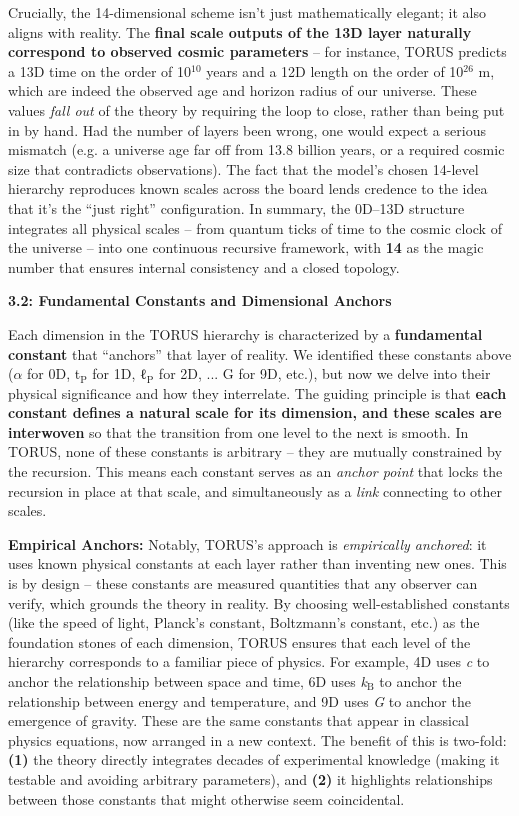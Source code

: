 \documentclass[]{article}
\newcommand{\subscript}[1]{\ensuremath{_{\mathrm{#1}}}}
\newcommand{\superscript}[1]{\ensuremath{^{\mathrm{#1}}}}
\begin{document}
Crucially, the 14-dimensional scheme isn't just mathematically elegant;
it also aligns with reality. The \textbf{final scale outputs of the 13D
layer naturally correspond to observed cosmic parameters} -- for
instance, TORUS predicts a 13D time on the order of 10\superscript{10} years and a
12D length on the order of 10\superscript{26} m, which are indeed the observed age
and horizon radius of our universe​. These values \emph{fall out} of the
theory by requiring the loop to close, rather than being put in by hand.
Had the number of layers been wrong, one would expect a serious mismatch
(e.g. a universe age far off from 13.8 billion years, or a required
cosmic size that contradicts observations). The fact that the model's
chosen 14-level hierarchy reproduces known scales across the board lends
credence to the idea that it's the ``just right'' configuration. In
summary, the 0D--13D structure integrates all physical scales -- from
quantum ticks of time to the cosmic clock of the universe -- into one
continuous recursive framework, with \textbf{14} as the magic number
that ensures internal consistency and a closed topology​.

\textbf{3.2: Fundamental Constants and Dimensional Anchors}

Each dimension in the TORUS hierarchy is characterized by a
\textbf{fundamental constant} that ``anchors'' that layer of reality. We
identified these constants above ($\alpha$ for 0D,
t\subscript{P} for 1D,
ℓ\subscript{P} for 2D, ...
G for 9D, etc.), but now we delve into their physical significance and
how they interrelate. The guiding principle is that \textbf{each
constant defines a natural scale for its dimension, and these scales are
interwoven} so that the transition from one level to the next is smooth.
In TORUS, none of these constants is arbitrary -- they are mutually
constrained by the recursion. This means each constant serves as an
\emph{anchor point} that locks the recursion in place at that scale, and
simultaneously as a \emph{link} connecting to other scales.

\textbf{Empirical Anchors:} Notably, TORUS's approach is
\emph{empirically anchored}: it uses known physical constants at each
layer rather than inventing new ones. This is by design -- these
constants are measured quantities that any observer can verify, which
grounds the theory in reality​. By choosing well-established constants
(like the speed of light, Planck's constant, Boltzmann's constant, etc.)
as the foundation stones of each dimension, TORUS ensures that each
level of the hierarchy corresponds to a familiar piece of physics. For
example, 4D uses \emph{c} to anchor the relationship between space and
time, 6D uses
\emph{k\subscript{B}} to
anchor the relationship between energy and temperature, and 9D uses
\emph{G} to anchor the emergence of gravity. These are the same
constants that appear in classical physics equations, now arranged in a
new context. The benefit of this is two-fold: \textbf{(1)} the theory
directly integrates decades of experimental knowledge (making it
testable and avoiding arbitrary parameters), and \textbf{(2)} it
highlights relationships between those constants that might otherwise
seem coincidental.
\end{document}
